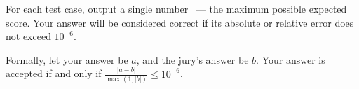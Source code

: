 For each test case, output a single number ~--- the maximum possible expected score. Your answer will be considered correct if its absolute or relative error does not exceed $10^{-6}$.

Formally, let your answer be $a$, and the jury's answer be $b$. Your answer is accepted if and only if $\frac{|a - b|}{\max(1, |b|)} \le 10^{-6}$.